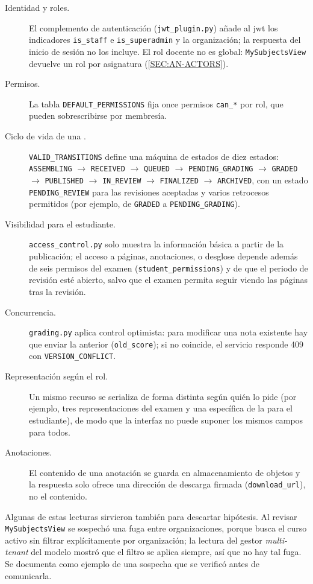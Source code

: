 \begin{description}
  \item[Identidad y roles.] El complemento de autenticación (\texttt{jwt\_plugin.py}) añade
        al \acs{jwt} los indicadores \texttt{is\_staff} e \texttt{is\_superadmin} y la
        organización; la respuesta del inicio de sesión no los incluye. El rol docente no es
        global: \texttt{MySubjectsView} devuelve un rol por asignatura
        (\cref{SEC:AN-ACTORS}).
  \item[Permisos.] La tabla \texttt{DEFAULT\_PERMISSIONS} fija once permisos
        \texttt{can\_*} por rol, que pueden sobrescribirse por membresía.
  \item[Ciclo de vida de una .] \texttt{VALID\_TRANSITIONS} define una
        máquina de estados de diez estados: \texttt{ASSEMBLING} $\rightarrow$
        \texttt{RECEIVED} $\rightarrow$ \texttt{QUEUED} $\rightarrow$
        \texttt{PENDING\_GRADING} $\rightarrow$ \texttt{GRADED} $\rightarrow$
        \texttt{PUBLISHED} $\rightarrow$ \texttt{IN\_REVIEW} $\rightarrow$
        \texttt{FINALIZED} $\rightarrow$ \texttt{ARCHIVED}, con un estado
        \texttt{PENDING\_REVIEW} para las revisiones aceptadas y varios retrocesos
        permitidos (por ejemplo, de \texttt{GRADED} a \texttt{PENDING\_GRADING}).
  \item[Visibilidad para el estudiante.] \texttt{access\_control.py} solo muestra la
        información básica a partir de la publicación; el acceso a páginas, anotaciones,
         o desglose depende además de seis permisos del examen
        (\texttt{student\_permissions}) y de que el periodo de revisión esté abierto, salvo
        que el examen permita seguir viendo las páginas tras la revisión.
  \item[Concurrencia.] \texttt{grading.py} aplica control optimista: para modificar una
        nota existente hay que enviar la anterior (\texttt{old\_score}); si no coincide, el
        servicio responde 409 con \texttt{VERSION\_CONFLICT}.
  \item[Representación según el rol.] Un mismo recurso se serializa de forma distinta según
        quién lo pide (por ejemplo, tres representaciones del examen y una específica de la
         para el estudiante), de modo que la interfaz no puede suponer los
        mismos campos para todos.
  \item[Anotaciones.] El contenido de una anotación se guarda en almacenamiento de objetos
        y la respuesta solo ofrece una dirección de descarga firmada
        (\texttt{download\_url}), no el contenido.
\end{description}
Algunas de estas lecturas sirvieron también para descartar hipótesis. Al revisar
\texttt{MySubjectsView} se sospechó una fuga entre organizaciones, porque busca el curso
activo sin filtrar explícitamente por organización; la lectura del gestor
\textit{multi-tenant} del modelo mostró que el filtro se aplica siempre, así que no hay tal
fuga. Se documenta como ejemplo de una sospecha que se verificó antes de comunicarla.

